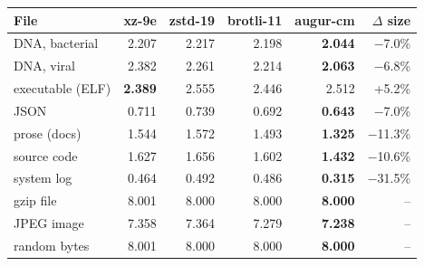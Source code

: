 \begin{tabular}{@{}lrrrrr@{}}
\toprule
File & xz-9e & zstd-19 & brotli-11 & augur-cm & $\Delta$ size \\
\midrule
DNA, bacterial & 2.207 & 2.217 & 2.198 & \textbf{2.044} & $-$7.0\% \\
DNA, viral & 2.382 & 2.261 & 2.214 & \textbf{2.063} & $-$6.8\% \\
executable (ELF) & \textbf{2.389} & 2.555 & 2.446 & 2.512 & +5.2\% \\
JSON & 0.711 & 0.739 & 0.692 & \textbf{0.643} & $-$7.0\% \\
prose (docs) & 1.544 & 1.572 & 1.493 & \textbf{1.325} & $-$11.3\% \\
source code & 1.627 & 1.656 & 1.602 & \textbf{1.432} & $-$10.6\% \\
system log & 0.464 & 0.492 & 0.486 & \textbf{0.315} & $-$31.5\% \\
\midrule
gzip file & 8.001 & 8.000 & 8.000 & \textbf{8.000} & -- \\
JPEG image & 7.358 & 7.364 & 7.279 & \textbf{7.238} & -- \\
random bytes & 8.001 & 8.000 & 8.000 & \textbf{8.000} & -- \\
\bottomrule
\end{tabular}
